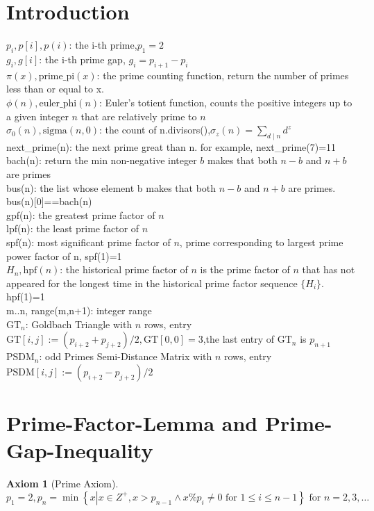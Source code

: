 \documentclass[12pt,a4paper,reqno]{amsart}
\numberwithin{equation}{section}
\theoremstyle{plain}
\newtheorem{axiom}[theorem]{Axiom}
\theoremstyle{definition}
\begin{document}
	
	\section{Introduction}
	$p_i,p[i],p(i)$: the i-th prime,$p_1=2$ \\
	$g_i,g[i]$: the i-th prime gap, $g_i = p_{i + 1} - p_i$ \\
	$\pi(x), \text{prime\_pi}(x)$: the prime counting function, return the number of primes less than or equal to x. \\
	$\phi(n), \text{euler\_phi}(n)$: Euler's totient function, counts the positive integers up to a given integer $n$ that are relatively prime to $n$\\
	$\sigma_0(n), \text{sigma}(n,0)$: the count of n.divisors(),${\sigma _{z}(n)=\sum _{d\mid n}d^{z}}$ \\
	next\_prime(n): the next prime great than n. for example, next\_prime(7)=11 \\
	bach(n): return the min non-negative integer $b$ makes that both $n-b$  and $n+b$ are primes \\
	bus(n): the list whose element b makes that both $n-b$ and $n+b$ are primes. bus(n)[0]==bach(n) \\
	gpf(n): the greatest prime factor of $n$ \\
	lpf(n): the least prime factor of $n$ \\
	spf(n): most significant prime factor of $n$, prime corresponding to largest prime power factor of n, spf(1)=1 \\
	$H_n, \text{hpf}(n)$: the historical prime factor of $n$ is the prime factor of $n$ that has not appeared for the longest time in the historical prime factor sequence $\{H_i\}$. hpf(1)=1\\
	m..n, range(m,n+1): integer range \\
	$\text{GT}_n$: Goldbach Triangle with $n$ rows, entry $\text{GT}[i,j]:=(p_{i+2}+p_{j+2})/2, \text{GT}[0,0]=3$,the last entry of $\text{GT}_n$ is $p_{n+1}$ \\
	$\text{PSDM}_n$: odd Primes Semi-Distance Matrix with $n$ rows, entry $\text{PSDM}[i,j]:=(p_{i+2}-p_{j+2})/2$
	
	\section{Prime-Factor-Lemma and Prime-Gap-Inequality}
	\begin{axiom}[Prime Axiom]\label{PrimeAxiom}
		\[p_1=2,p_n=\min  \left\{x\left|x\in Z^+\right.,x>p_{n-1}\land x\%  p_i\neq 0 \text{ for } 1\leq i\leq n-1\right\} \text{ for }n=2,3,\dots\]
	\end{axiom}
	
\end{document}
